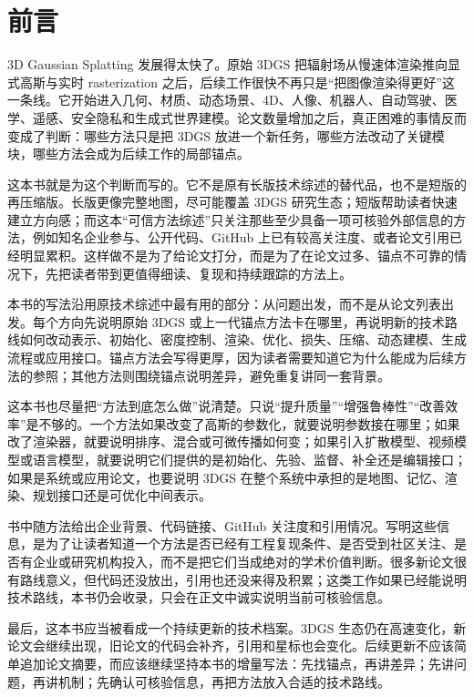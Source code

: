 
\chapter{前言}

3D Gaussian Splatting 发展得太快了。原始 3DGS 把辐射场从慢速体渲染推向显式高斯与实时 rasterization 之后，后续工作很快不再只是“把图像渲染得更好”这一条线。它开始进入几何、材质、动态场景、4D、人像、机器人、自动驾驶、医学、遥感、安全隐私和生成式世界建模。论文数量增加之后，真正困难的事情反而变成了判断：哪些方法只是把 3DGS 放进一个新任务，哪些方法改动了关键模块，哪些方法会成为后续工作的局部锚点。

这本书就是为这个判断而写的。它不是原有长版技术综述的替代品，也不是短版的再压缩版。长版更像完整地图，尽可能覆盖 3DGS 研究生态；短版帮助读者快速建立方向感；而这本“可信方法综述”只关注那些至少具备一项可核验外部信息的方法，例如知名企业参与、公开代码、GitHub 上已有较高关注度、或者论文引用已经明显累积。这样做不是为了给论文打分，而是为了在论文过多、锚点不可靠的情况下，先把读者带到更值得细读、复现和持续跟踪的方法上。

本书的写法沿用原技术综述中最有用的部分：从问题出发，而不是从论文列表出发。每个方向先说明原始 3DGS 或上一代锚点方法卡在哪里，再说明新的技术路线如何改动表示、初始化、密度控制、渲染、优化、损失、压缩、动态建模、生成流程或应用接口。锚点方法会写得更厚，因为读者需要知道它为什么能成为后续方法的参照；其他方法则围绕锚点说明差异，避免重复讲同一套背景。

这本书也尽量把“方法到底怎么做”说清楚。只说“提升质量”“增强鲁棒性”“改善效率”是不够的。一个方法如果改变了高斯的参数化，就要说明参数接在哪里；如果改了渲染器，就要说明排序、混合或可微传播如何变；如果引入扩散模型、视频模型或语言模型，就要说明它们提供的是初始化、先验、监督、补全还是编辑接口；如果是系统或应用论文，也要说明 3DGS 在整个系统中承担的是地图、记忆、渲染、规划接口还是可优化中间表示。

书中随方法给出企业背景、代码链接、GitHub 关注度和引用情况。写明这些信息，是为了让读者知道一个方法是否已经有工程复现条件、是否受到社区关注、是否有企业或研究机构投入，而不是把它们当成绝对的学术价值判断。很多新论文很有路线意义，但代码还没放出，引用也还没来得及积累；这类工作如果已经能说明技术路线，本书仍会收录，只会在正文中诚实说明当前可核验信息。

\enlargethispage{4\baselineskip}
最后，这本书应当被看成一个持续更新的技术档案。3DGS 生态仍在高速变化，新论文会继续出现，旧论文的代码会补齐，引用和星标也会变化。后续更新不应该简单追加论文摘要，而应该继续坚持本书的增量写法：先找锚点，再讲差异；先讲问题，再讲机制；先确认可核验信息，再把方法放入合适的技术路线。

